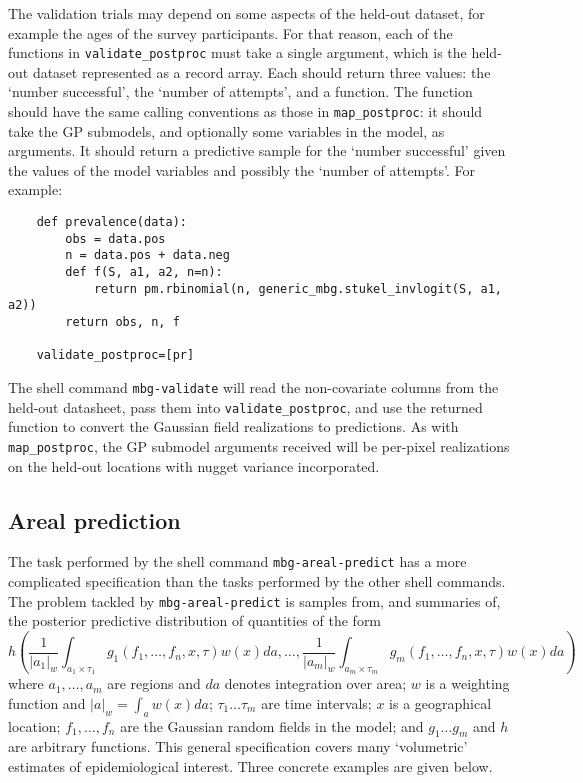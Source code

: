 The validation trials may depend on some aspects of the held-out dataset, for example the ages of the survey participants. For that reason, each of the functions in \texttt{validate\_postproc} must take a single argument, which is the held-out dataset represented as a record array. Each should return three values: the `number successful', the `number of attempts', and a function. The function should have the same calling conventions as those in \texttt{map\_postproc}: it should take the GP submodels, and optionally some variables in the model, as arguments. It should return a predictive sample for the `number successful' given the values of the model variables and possibly the `number of attempts'. For example:
\begin{verbatim}
    def prevalence(data):
        obs = data.pos
        n = data.pos + data.neg
        def f(S, a1, a2, n=n):
            return pm.rbinomial(n, generic_mbg.stukel_invlogit(S, a1, a2))
        return obs, n, f

    validate_postproc=[pr]    
\end{verbatim}

The shell command \texttt{mbg-validate} will read the non-covariate columns from the held-out datasheet, pass them into \texttt{validate\_postproc}, and use the returned function to convert the Gaussian field realizations to predictions. As with \texttt{map\_postproc}, the GP submodel arguments received will be per-pixel realizations on the held-out locations with nugget variance incorporated.

\subsection{Areal prediction}  

The task performed by the shell command \texttt{mbg-areal-predict} has a more complicated specification than the tasks performed by the other shell commands. The problem tackled by \texttt{mbg-areal-predict} is samples from, and summaries of, the posterior predictive distribution of quantities of the form
\begin{equation}
    \label{eq:areal-targ} 
    h\left(\frac{1}{|a_1|_w}\int_{a_1\times \tau_1} g_1(f_1,\ldots,f_n,x,\tau)w(x)da, \ldots,\frac{1}{|a_m|_w}\int_{a_m\times\tau_m} g_m(f_1,\ldots,f_n,x,\tau)w(x)da\right)
\end{equation}
where $a_1,\ldots,a_m$ are regions and $da$ denotes integration over area; $w$ is a weighting function and $|a|_w=\int_a w(x)da$; $\tau_1\ldots\tau_m$ are time intervals; $x$ is a geographical location; $f_1,\ldots,f_n$ are the Gaussian random fields in the model; and $g_1\ldots g_m$ and $h$ are arbitrary functions. This general specification covers many `volumetric' estimates of epidemiological interest. Three concrete examples are given below.

